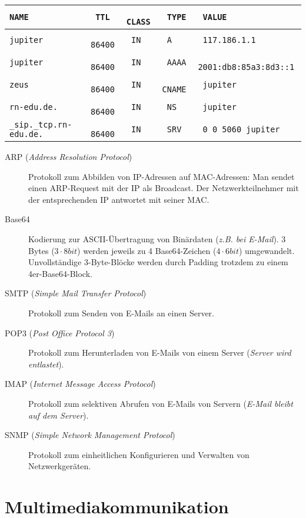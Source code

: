 \documentclass[a4paper]{article}
\begin{document}
\begin{tabular}{>{\tt}l>{\tt}l>{\tt}l>{\tt}l>{\tt}l}
    NAME & TTL & CLASS & TYPE & VALUE \\ \hline
    jupiter & 86400 & IN & A & 117.186.1.1 \\
    jupiter & 86400 & IN & AAAA & 2001:db8:85a3:8d3::1 \\
    zeus & 86400 & IN & CNAME & jupiter \\
    rn-edu.de. & 86400 & IN & NS & jupiter \\
    \_sip.\_tcp.rn-edu.de. & 86400 & IN & SRV & 0 0 5060 jupiter
\end{tabular}

\begin{description}
    \item[ARP (\textit{Address Resolution Protocol})] Protokoll zum Abbilden von IP-Adressen auf MAC-Adressen: Man sendet einen ARP-Request mit der IP als Broadcast. Der Netzwerkteilnehmer mit der entsprechenden IP antwortet mit seiner MAC.
    \item[Base64] Kodierung zur ASCII-Übertragung von Binärdaten (\textit{z.B. bei E-Mail}). 3 Bytes ($3 \cdot 8 bit$) werden jeweils zu 4 Base64-Zeichen ($4 \cdot 6 bit$) umgewandelt. Unvollständige 3-Byte-Blöcke werden durch Padding trotzdem zu einem 4er-Base64-Block.
    \item[SMTP (\textit{Simple Mail Transfer Protocol})] Protokoll zum Senden von E-Mails an einen Server.
    \item[POP3 (\textit{Post Office Protocol 3})] Protokoll zum Herunterladen von E-Mails von einem Server (\textit{Server wird entlastet}).
    \item[IMAP (\textit{Internet Message Access Protocol})] Protokoll zum selektiven Abrufen von E-Mails von Servern (\textit{E-Mail bleibt auf dem Server}).
    \item[SNMP (\textit{Simple Network Management Protocol})] Protokoll zum einheitlichen Konfigurieren und Verwalten von Netzwerkgeräten.
\end{description}

\section{Multimediakommunikation}
\end{document}
